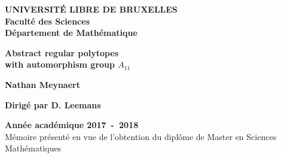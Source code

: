 \begin{titlepage}

  \centering

  \textbf{UNIVERSITÉ LIBRE DE BRUXELLES}\\
  \textbf{Faculté des Sciences}\\
  \textbf{Département de Mathématique}

  \vfill

  \textbf{\Large Abstract regular polytopes\\ with automorphism group $A_{11}$}

  \vfill

  \textbf{\Large Nathan Meynaert}

  \vfill

  \textbf{Dirigé par D. Leemans}

  \vfill

  \textbf{Année académique 2017~-~2018}\\
  Mémoire présenté en vue de l'obtention du diplôme de Master en Sciences Mathématiques

\end{titlepage}

\setcounter{page}{2}
